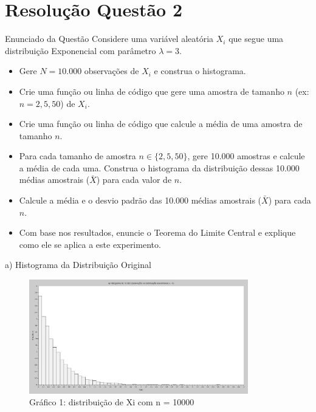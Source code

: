 \section{Resolução Questão 2}

\begin{frame}[fragile]{Enunciado da Questão}
    Considere uma variável aleatória $X_i$ que segue uma distribuição Exponencial com parâmetro $\lambda = 3$.
    \vspace{1em}
    
    \begin{itemize}
        \item[\textbf{a)}] Gere $N = 10.000$ observações de $X_i$ e construa o histograma.
        \item[\textbf{b)}] Crie uma função ou linha de código que gere uma amostra de tamanho $n$ (ex: $n=2, 5, 50$) de $X_i$.
        \item[\textbf{c)}] Crie uma função ou linha de código que calcule a média de uma amostra de tamanho $n$.
        \item[\textbf{d)}] Para cada tamanho de amostra $n \in \{2, 5, 50\}$, gere 10.000 amostras e calcule a média de cada uma. Construa o histograma da distribuição dessas 10.000 médias amostrais ($\bar{X}$) para cada valor de $n$.
        \item[\textbf{e)}] Calcule a média e o desvio padrão das 10.000 médias amostrais ($\bar{X}$) para cada $n$.
        \item[\textbf{f)}] Com base nos resultados, enuncie o Teorema do Limite Central e explique como ele se aplica a este experimento.
    \end{itemize}
\end{frame}

\begin{frame}{a) Histograma da Distribuição Original}
    \begin{figure}
        \includegraphics[width=0.85\textwidth]{figures/grafico1_dist_xi.jpg}
        \caption*{Gráfico 1: distribuição de Xi com n = 10000}
    \end{figure}
\end{frame}

